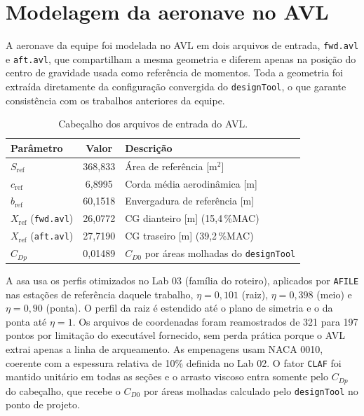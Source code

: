 \newpage
\section{Modelagem da aeronave no AVL}

A aeronave da equipe foi modelada no AVL em dois arquivos de entrada,
\texttt{fwd.avl} e \texttt{aft.avl}, que compartilham a mesma geometria e
diferem apenas na posição do centro de gravidade usada como referência de
momentos. Toda a geometria foi extraída diretamente da configuração
convergida do \texttt{designTool}, o que garante consistência com os
trabalhos anteriores da equipe.

\begin{table}[H]
\centering
\caption{Cabeçalho dos arquivos de entrada do AVL.}\label{tab:avl_header}
\renewcommand{\arraystretch}{1.25}
\begin{tabular}{lcl}
\toprule
Parâmetro & Valor & Descrição \\
\midrule
$S_{\mathrm{ref}}$ & 368,833 & Área de referência [m$^2$] \\
$c_{\mathrm{ref}}$ & 6,8995 & Corda média aerodinâmica [m] \\
$b_{\mathrm{ref}}$ & 60,1518 & Envergadura de referência [m] \\
$X_{\mathrm{ref}}$ (\texttt{fwd.avl}) & 26,0772 & CG dianteiro [m] (15,4\,\%MAC) \\
$X_{\mathrm{ref}}$ (\texttt{aft.avl}) & 27,7190 & CG traseiro [m] (39,2\,\%MAC) \\
$C_{Dp}$ & 0,01489 & $C_{D0}$ por áreas molhadas do \texttt{designTool} \\
\bottomrule
\end{tabular}
\end{table}

A asa usa os perfis otimizados no Lab 03 (família do roteiro), aplicados por
\texttt{AFILE} nas estações de referência daquele trabalho, $\eta = 0{,}101$
(raiz), $\eta = 0{,}398$ (meio) e $\eta = 0{,}90$ (ponta). O perfil da raiz é
estendido até o plano de simetria e o da ponta até $\eta = 1$. Os arquivos de
coordenadas foram reamostrados de 321 para 197 pontos por limitação do
executável fornecido, sem perda prática porque o AVL extrai apenas a linha de
arqueamento. As empenagens usam NACA 0010, coerente com a espessura relativa
de 10\% definida no Lab 02. O fator \texttt{CLAF} foi mantido unitário em
todas as seções e o arrasto viscoso entra somente pelo $C_{Dp}$ do cabeçalho,
que recebe o $C_{D0}$ por áreas molhadas calculado pelo \texttt{designTool}
no ponto de projeto.

